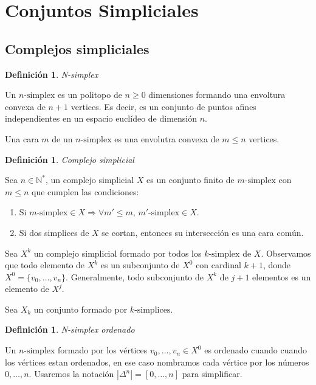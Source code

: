 \documentclass[11pt,a4paper,openright,oneside]{article}
\numberwithin{equation}{section}
\newtheorem{defi}[teo]{Definici\'on}
\theoremstyle{definition}
\begin{document}
\section{Conjuntos Simpliciales}
\subsection{Complejos simpliciales}
\begin{defi}
    N-simplex
\end{defi}
Un $n\text{-simplex}$ es un politopo de $n\ge 0$ dimensiones formando una envoltura convexa de $n+1$ vertices. Es decir, es un conjunto de puntos afines independientes en un espacio eucl\'ideo de dimensi\'on $n$.

Una cara $m$ de un $n\text{-simplex}$ es una envolutra convexa de $m\le n$ vertices.

\begin{defi}
    Complejo simplicial
\end{defi}
Sea $n\in\mathbb{N}^{*}$, un complejo simplicial $X$ es un conjunto finito de $m\text{-simplex}$ con $m\le n$ que cumplen las condiciones:

\begin{enumerate}[(1)]
    \item Si $m\text{-simplex}\in X \Rightarrow \forall m'\le m\text{, }m'\text{-simplex}\in X$.
    \item Si dos simplices de $X$ se cortan, entonces su intersecci\'on es una cara com\'un.
\end{enumerate}

Sea $X^k$ un complejo simplicial formado por todos los $k\text{-simplex}$ de $X$. Observamos que todo elemento de $X^k$ es un subconjunto de $X^0$ con cardinal $k+1$, donde $X^0=\{v_0,\dots ,v_n\}$.
Generalmente, todo subconjunto de $X^k$ de $j+1$ elementos es un elemento de $X^j$.

Sea $X_k$ un conjunto formado por $k\text{-simplices}$.

\begin{defi}
    N-simplex ordenado
\end{defi}
Un $n\text{-simplex}$ formado por los v\'ertices $v_0,\dots,v_n \in X^0$ es ordenado cuando cuando los v\'ertices estan ordenados, en ese caso nombramos cada v\'ertice por los n\'umeros $0,\dots,n$. Usaremos la notaci\'on $|\Delta^n| = [0,\dots,n]$ para simplificar.
\end{document}
